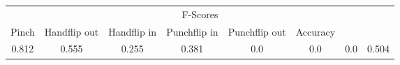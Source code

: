 \documentclass{standalone}
\begin{document}
 
 \begin{tabular}{|c|c|c|c|c|c|c ||c|}
\cline{1-8}\multicolumn{8}{|c|}{F-Scores} \\ 
\cline{1-8}Pinch & Handflip out & Handflip in & Punchflip in & Punchflip out & Accuracy\\ 
\cline{1-8}0.812 & 0.555 & 0.255 & 0.381 & 0.0 & 0.0 & 0.0 & 0.504\\ 
 \cline{1-8}\hline \end{tabular}
 
\end{document}
